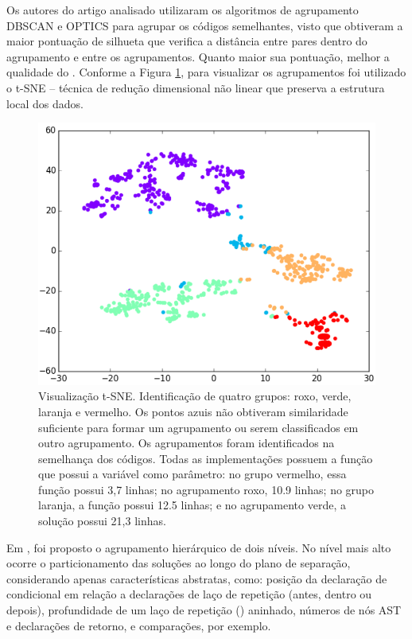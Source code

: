 	    Os autores do artigo analisado utilizaram os algoritmos de agrupamento
	    DBSCAN\cite{Ester1996} e OPTICS\cite{Ankerst1999} para agrupar os códigos
	    semelhantes, visto que obtiveram a maior pontuação de silhueta que verifica
	    a distância entre pares dentro do agrupamento e entre os agrupamentos.
	    Quanto maior sua pontuação, melhor a qualidade do . Conforme
	    a Figura \ref{fig:t-SNE}, para visualizar os agrupamentos foi utilizado o
	    t-SNE – técnica de redução dimensional não linear que preserva a estrutura
	    local dos dados.
	    \begin{figure}[ht]
	        \centering
	        \includegraphics[scale=0.5]{imagem/visualizacao-tSNE.png}
	        \caption{Visualização t-SNE. Identificação de quatro grupos: roxo, verde,
	        	laranja e vermelho. Os pontos azuis não obtiveram similaridade
	        	suficiente para formar um agrupamento ou serem classificados em
	        	outro agrupamento. Os agrupamentos foram identificados na semelhança
	        	dos códigos. Todas as implementações possuem a função 
	        	que possui a variável  como parâmetro: no grupo vermelho,
	        	essa função possui 3,7 linhas; no agrupamento roxo, 10.9 linhas; no
	        	grupo laranja, a função possui 12.5 linhas; e no agrupamento verde,
	        	a solução possui 21,3 linhas.}
	        \label{fig:t-SNE}
	    \end{figure}
	
	    
	    Em , foi proposto o agrupamento hierárquico de dois
	    níveis. No nível mais alto ocorre o particionamento das soluções ao longo do
	    plano de separação, considerando apenas características abstratas, como:
	    posição da declaração de condicional em relação a declarações de laço de
	    repetição (antes, dentro ou depois), profundidade de um laço de repetição
	    () aninhado, números de nós AST e declarações de retorno,
	     e comparações, por exemplo.
	    
